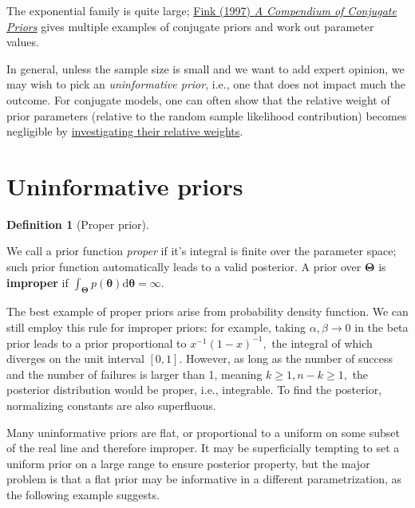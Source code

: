 \documentclass[
  11pt,
  letterpaper,
]{scrbook}
\theoremstyle{definition}
\theoremstyle{plain}
\theoremstyle{plain}
\theoremstyle{plain}
\theoremstyle{definition}
\theoremstyle{definition}
\newtheorem{definition}{Definition}[chapter]
\theoremstyle{plain}
\theoremstyle{plain}
\theoremstyle{remark}
\begin{document}
The exponential family is quite large;
\href{https://www.johndcook.com/CompendiumOfConjugatePriors.pdf}{Fink
(1997) \emph{A Compendium of Conjugate Priors}} gives multiple examples
of conjugate priors and work out parameter values.

In general, unless the sample size is small and we want to add expert
opinion, we may wish to pick an \emph{uninformative prior}, i.e., one
that does not impact much the outcome. For conjugate models, one can
often show that the relative weight of prior parameters (relative to the
random sample likelihood contribution) becomes negligible by
\href{https://en.wikipedia.org/wiki/Conjugate_prior}{investigating their
relative weights}.

\section{Uninformative priors}\label{uninformative-priors}

\begin{definition}[Proper
prior]\protect\hypertarget{def-properprior}{}\label{def-properprior}

We call a prior function \emph{proper} if it's integral is finite over
the parameter space; such prior function automatically leads to a valid
posterior. A prior over \(\boldsymbol{\Theta}\) is \textbf{improper} if
\(\int_{\boldsymbol{\Theta}} p(\boldsymbol{\theta}) \mathrm{d} \boldsymbol{\theta} = \infty.\)

\end{definition}

The best example of proper priors arise from probability density
function. We can still employ this rule for improper priors: for
example, taking \(\alpha, \beta \to 0\) in the beta prior leads to a
prior proportional to \(x^{-1}(1-x)^{-1},\) the integral of which
diverges on the unit interval \([0,1].\) However, as long as the number
of success and the number of failures is larger than 1, meaning
\(k \geq 1, n-k \geq 1,\) the posterior distribution would be proper,
i.e., integrable. To find the posterior, normalizing constants are also
superfluous.

Many uninformative priors are flat, or proportional to a uniform on some
subset of the real line and therefore improper. It may be superficially
tempting to set a uniform prior on a large range to ensure posterior
property, but the major problem is that a flat prior may be informative
in a different parametrization, as the following example suggests.
\end{document}
